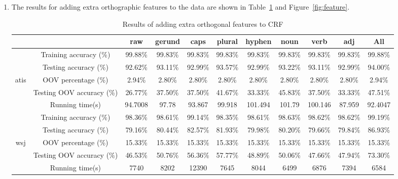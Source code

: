 \documentclass[winfonts,UTF8]{article}
\begin{document}
\begin{enumerate}
\item
The results for adding extra orthographic features to the data are shown in Table~\ref{tab:feature} and Figure~\ref{fig:feature}.\\
\begin{table}[!htbp]
\centering 
{\footnotesize
\begin{tabular}{c|c|c|c|c|c|c|c|c|c|c}
\hline
\multicolumn{2}{c|}{}& raw & gerund & caps & plural & hyphen & noun & verb & adj & All \\
\hline
\hline
& Training accuracy (\%) & 99.88\% & 99.83\% & 99.83\% & 99.83\% & 99.83\% & 99.83\% & 99.83\% & 99.83\% & 99.88\% \\
\cline{2-11}
& Testing accuracy (\%) & 92.62\% & 93.11\% & 92.99\% & 93.57\% & 92.99\% & 93.22\% & 93.11\% & 92.99\% & 94.00\% \\
\cline{2-11}
atis& OOV percentage (\%) & 2.94\% & 2.80\% & 2.80\% & 2.80\% & 2.80\% & 2.80\% & 2.80\% & 2.80\% & 2.94\% \\
\cline{2-11}
& Testing OOV accuracy (\%) & 26.77\% & 37.50\% & 37.50\% & 41.67\% & 33.33\% & 45.83\% & 37.50\% & 33.33\% & 47.51\% \\
\cline{2-11}
& Running time(s) & 94.7008 & 97.78 & 93.867 & 99.918 & 101.494 & 101.79 & 100.146 & 87.959 & 92.4047 \\
\hline
\hline
& Training accuracy (\%) & 98.36\% & 98.61\% & 99.14\% & 98.35\% & 98.61\% & 98.63\% & 98.62\% & 98.62\% & 99.19\% \\
\cline{2-11}
& Testing accuracy (\%) & 79.16\% & 80.44\% & 82.57\% & 81.93\% & 79.98\% & 80.20\% & 79.66\% & 79.84\% & 86.93\% \\
\cline{2-11}
wsj& OOV percentage (\%) & 15.33\% & 15.33\% & 15.33\% & 15.33\% & 15.33\% & 15.33\% & 15.33\% & 15.33\% & 15.33\% \\
\cline{2-11}
& Testing OOV accuracy (\%) & 46.53\% & 50.76\% & 56.36\% & 57.77\% & 48.89\% & 50.06\% & 47.66\% & 47.94\% & 73.30\% \\
\cline{2-11}
& Running time(s) & 7740 & 8202 & 12390 & 7645 & 8044 & 6499 & 6876 & 7394 & 6584 \\
\hline

\end{tabular} 
}
\caption{Results of adding extra orthogonal features to CRF}
\label{tab:feature}
\end{table}



\end{enumerate}
\end{document}

